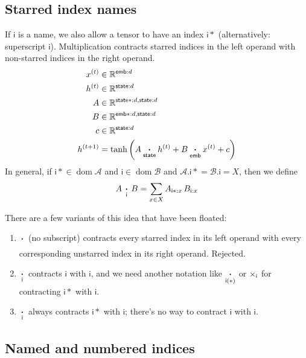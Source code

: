 \documentclass{article}
\newcommand{\name}[1]{\mathsf{#1}}
\newcommand{\ndot}[1]{\mathbin{\mathop{\thinspace\boldsymbol\cdot\thinspace}\limits_{\name{#1}}}}
\DeclareMathOperator{\tupledom}{dom}
\newcommand{\tupleproj}[2]{#1.#2}
\begin{document}
\subsection{Starred index names}

If $\name{i}$ is a name, we also allow a tensor to have an index $\name{i*}$ (alternatively: superscript $\name{i}$). Multiplication contracts starred indices in the left operand with non-starred indices in the right operand.
\begin{align*}
x^{(t)} &\in \mathbb{R}^{\name{emb}: d} \\
h^{(t)} &\in \mathbb{R}^{\name{state}: d} \\
A &\in \mathbb{R}^{\name{state*}: d, \name{state}: d} \\
B &\in \mathbb{R}^{\name{emb*}: d, \name{state}: d} \\
c &\in \mathbb{R}^{\name{state}: d} \\
h^{(t+1)} &= \tanh\left( A \ndot{state} h^{(t)} + B \ndot{emb} x^{(t)} + c \right) 
\end{align*}
In general, if $\name{i*} \in \tupledom \mathcal{A}$ and $\name{i} \in \tupledom \mathcal{B}$ and $\tupleproj{\mathcal{A}}{\name{i*}} = \tupleproj{\mathcal{B}}{\name{i}} = X$, then we define
\begin{equation*}
A \ndot{i} B = \sum_{x \in X} A_{\name{i*}: x} \, B_{\name{i}: x}
\end{equation*}

There are a few variants of this idea that have been floated:
\begin{enumerate}
\item $\ndot{}$ (no subscript) contracts every starred index in its left operand with every corresponding unstarred index in its right operand. Rejected.
\item $\ndot{i}$ contracts $\name{i}$ with $\name{i}$, and we need another notation like $\ndot{i(*)}$ or $\mathop\times\displaylimits_{\name{i}}$ for contracting $\name{i*}$ with $\name{i}$.
\item $\ndot{i}$ always contracts $\name{i*}$ with $\name{i}$; there's no way to contract $\name{i}$ with $\name{i}$.
\end{enumerate}

\subsection{Named and numbered indices}
\label{sec:tensorsoftensors}
\end{document}
